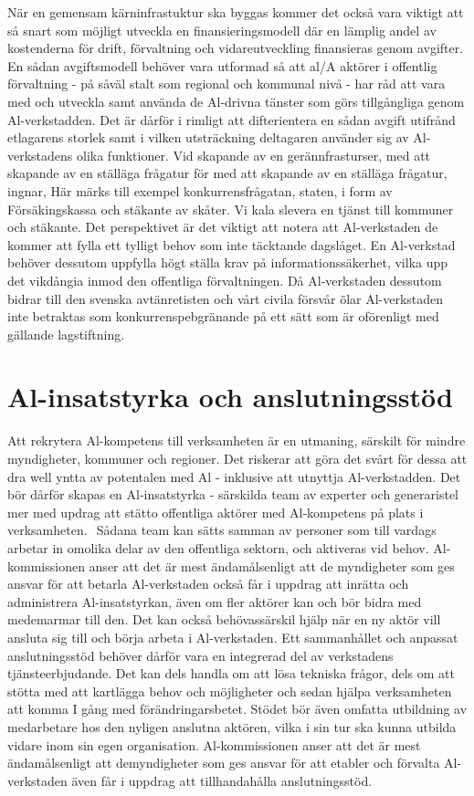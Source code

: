 {{{{{När en gemensam kärninfrastuktur ska byggas kommer det också vara viktigt att så snart som möjligt utveckla en finansieringsmodell där en lämplig andel av kostenderna för drift, förvaltning och vidareutveckling finansieras genom avgifter. En sådan avgiftsmodell behöver vara utformad så att al/A aktörer i offentlig förvaltning - på såväl stalt som regional och kommunal nivå - har råd att vara med och utveckla samt använda de Al-drivna tänster som görs tillgångliga genom Al-verkstadden. Det är dårför i rimligt att difterientera en sådan avgift utifrånd etlagarens storlek samt i vilken utsträckning deltagaren använder sig av Al-verkstadens olika funktioner.
Vid skapande av en gerännfrasturser, med att skapande av en ställäga frågatur för med att skapande av en ställäga frågatur, ingnar, Här märks till exempel konkurrensfrågatan, staten, i form av Försäkingskassa och stäkante av skåter. Vi kala slevera en tjänst till kommuner och stäkante. Det perspektivet är det viktigt att notera att Al-verkstaden de kommer att fylla ett tylligt behov som inte täcktande dagslåget. En Al-verkstad behöver dessutom uppfylla högt ställa krav på informationssäkerhet, vilka upp det vikdångia inmod den offentliga förvaltningen. Då Al-verkstaden dessutom bidrar till den svenska avtänretisten och vårt civila försvår õlar Al-verkstaden inte betraktas som konkurrenspebgränande på ett sätt som är oförenligt med gällande lagstiftning.
\section*{Al-insatstyrka och anslutningsstöd}
Att rekrytera Al-kompetens till verksamheten är en utmaning, särskilt för mindre myndigheter, kommuner och regioner. Det riskerar att göra det svårt för dessa att dra well yntta av potentalen med Al - inklusive att utnyttja Al-verkstadden. Det bör dårför skapas en Al-insatstyrka - särskilda team av experter och generaristel mer med updrag att stätto offentliga aktörer med Al-kompetens på plats i verksamheten. \({ }^{}\) Sådana team kan sätts samman av personer som till vardags arbetar in omolika delar av den offentliga sektorn, och aktiveras vid behov. Al-kommissionen anser att det är mest ändamålsenligt att de myndigheter som ges ansvar för att betarla Al-verkstaden också får i uppdrag att inrätta och administrera Al-insatstyrkan, även om fler aktörer kan och bör bidra med medemarmar till den.
Det kan också behövassärskil hjälp när en ny aktör vill ansluta sig till och börja arbeta i Al-verkstaden. Ett sammanhållet och anpassat anslutningsstöd behöver dårför vara en integrerad del av verkstadens tjänsteerbjudande. Det kan dels handla om att lösa tekniska frågor, dels om att stötta med att kartlägga behov och möjligheter och sedan hjälpa verksamheten att komma I gång med förändringarsbetet.
Stödet bör även omfatta utbildning av medarbetare hos den nyligen anslutna aktören, vilka i sin tur ska kunna utbilda vidare inom sin egen organisation. Al-kommissionen anser att det är mest ändamålsenligt att demyndigheter som ges ansvar för att etabler och förvalta Al-verkstaden även får i uppdrag att tillhandahålla anslutningsstöd.
}}}}}
